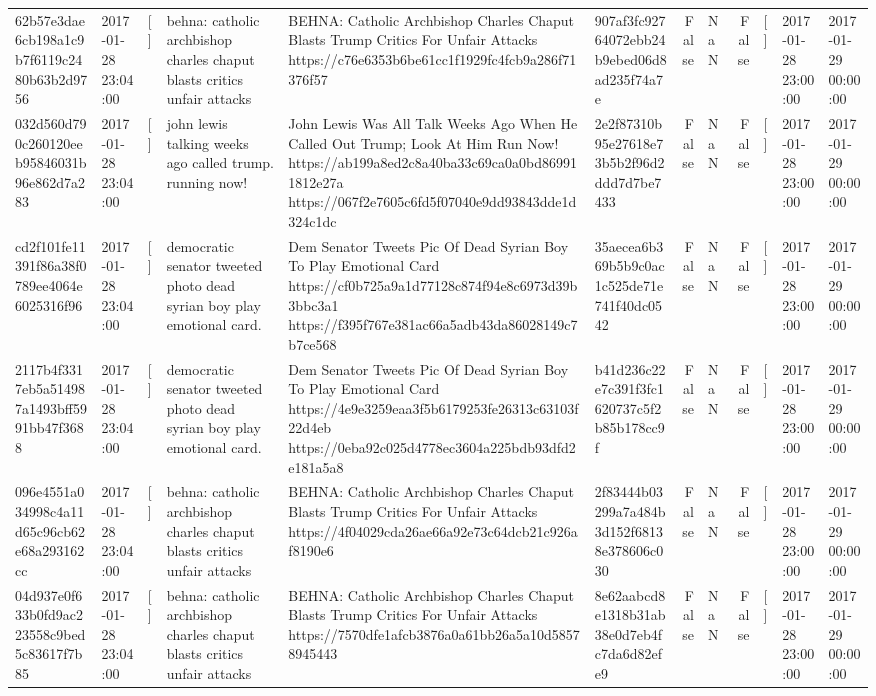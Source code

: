 \begin{tabular}{llllllrlrlll}
62b57e3dae6cb198a1c9b7f6119c2480b63b2d9756 & 2017-01-28 23:04:00 & [] & behna: catholic archbishop charles chaput blasts critics unfair attacks & BEHNA: Catholic Archbishop Charles Chaput Blasts Trump Critics For Unfair Attacks https://c76e6353b6be61cc1f1929fc4fcb9a286f71376f57 & 907af3fc92764072ebb24b9ebed06d8ad235f74a7e & False & NaN & False & [] & 2017-01-28 23:00:00 & 2017-01-29 00:00:00 \\
032d560d790c260120eeb95846031b96e862d7a283 & 2017-01-28 23:04:00 & [] & john lewis talking weeks ago called trump. running now! & John Lewis Was All Talk Weeks Ago When He Called Out Trump; Look At Him Run Now! https://ab199a8ed2c8a40ba33c69ca0a0bd869911812e27a https://067f2e7605c6fd5f07040e9dd93843dde1d324c1dc & 2e2f87310b95e27618e73b5b2f96d2ddd7d7be7433 & False & NaN & False & [] & 2017-01-28 23:00:00 & 2017-01-29 00:00:00 \\
cd2f101fe11391f86a38f0789ee4064e6025316f96 & 2017-01-28 23:04:00 & [] & democratic senator tweeted photo dead syrian boy play emotional card. & Dem Senator Tweets Pic Of Dead Syrian Boy To Play Emotional Card https://cf0b725a9a1d77128c874f94e8c6973d39b3bbc3a1 https://f395f767e381ac66a5adb43da86028149c7b7ce568 & 35aecea6b369b5b9c0ac1c525de71e741f40dc0542 & False & NaN & False & [] & 2017-01-28 23:00:00 & 2017-01-29 00:00:00 \\
2117b4f3317eb5a514987a1493bff5991bb47f3688 & 2017-01-28 23:04:00 & [] & democratic senator tweeted photo dead syrian boy play emotional card. & Dem Senator Tweets Pic Of Dead Syrian Boy To Play Emotional Card https://4e9e3259eaa3f5b6179253fe26313c63103f22d4eb https://0eba92c025d4778ec3604a225bdb93dfd2e181a5a8 & b41d236c22e7c391f3fc1620737c5f2b85b178cc9f & False & NaN & False & [] & 2017-01-28 23:00:00 & 2017-01-29 00:00:00 \\
096e4551a034998c4a11d65c96cb62e68a293162cc & 2017-01-28 23:04:00 & [] & behna: catholic archbishop charles chaput blasts critics unfair attacks & BEHNA: Catholic Archbishop Charles Chaput Blasts Trump Critics For Unfair Attacks https://4f04029cda26ae66a92e73c64dcb21c926af8190e6 & 2f83444b03299a7a484b3d152f68138e378606c030 & False & NaN & False & [] & 2017-01-28 23:00:00 & 2017-01-29 00:00:00 \\
04d937e0f633b0fd9ac223558c9bed5c83617f7b85 & 2017-01-28 23:04:00 & [] & behna: catholic archbishop charles chaput blasts critics unfair attacks & BEHNA: Catholic Archbishop Charles Chaput Blasts Trump Critics For Unfair Attacks https://7570dfe1afcb3876a0a61bb26a5a10d58578945443 & 8e62aabcd8e1318b31ab38e0d7eb4fc7da6d82efe9 & False & NaN & False & [] & 2017-01-28 23:00:00 & 2017-01-29 00:00:00 \\

\end{tabular}
